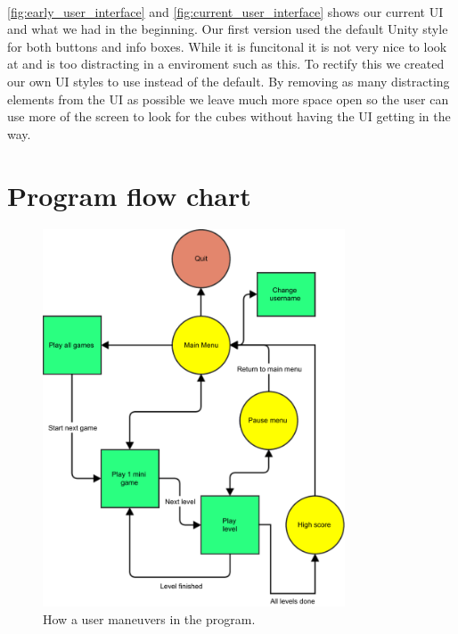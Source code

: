 \paragraph{}
\autoref{fig:early_user_interface} and \autoref{fig:current_user_interface} shows our current UI and what we had in the beginning.
Our first version used the default Unity style for both buttons and info boxes.
While it is funcitonal it is not very nice to look at and is too distracting in a enviroment such as this.
To rectify this we created our own UI styles to use instead of the default.
By removing as many distracting elements from the UI as possible we leave much more space open so the user can use more of the
screen to look for the cubes without having the UI getting in the way.



\section{Program flow chart}

\begin{figure}[h]
	\capstart
	\centering
	\includegraphics[width=0.8\textwidth]{images/user_flow_chart}
	\caption[Program flow chart]{How a user maneuvers in the program.}
	\label{fig:program_flow_chart}
\end{figure}

